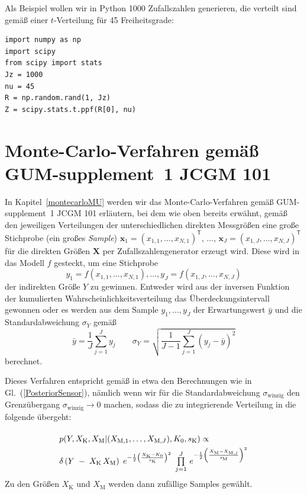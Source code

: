 Als Beispiel wollen wir in Python 1000 Zufalls\-zahlen generieren,
die verteilt sind gemäß einer $t$-Verteilung für 45 Freiheitsgrade:
\begin{lstlisting}[style=Python]
import numpy as np
import scipy
from scipy import stats
Jz = 1000
nu = 45
R = np.random.rand(1, Jz)
Z = scipy.stats.t.ppf(R[0], nu)
\end{lstlisting}

\section{Monte-Carlo-Verfahren gemäß GUM-supplement~1 JCGM 101}

In Kapitel~\ref{montecarloMU} werden wir das Monte-Carlo-Verfahren gemäß GUM-supplement~1 JCGM 101
erläutern, bei dem wie oben bereits erwähnt,
gemäß den jeweiligen Ver\-teil\-ungen der unterschiedlichen direkten Messgrößen
eine große Stichprobe (ein großes \textsl{Sample}) 
$\mathbf{x}_1 = (x_{1,1},\dots,x_{N,1})^\mathsf{T}$, $\dots$, $\mathbf{x}_J = (x_{1,J},\dots,x_{N,J})^\mathsf{T}$
für die direkten Größen $\mathbf{X}$ per Zufallszahlengenerator erzeugt
wird. Diese wird in das Modell $f$ gesteckt,
um eine Stichprobe
\begin{equation}
y_1 = f(x_{1,1},\dots,x_{N,1}), \dots, y_J = f(x_{1,J},\dots,x_{N,J})
\end{equation}
der indirekten Größe $Y$ zu gewinnen. Entweder wird aus der inversen Funktion der kumulierten
Wahrscheinlichkeitsverteilung das Überdeckungsintervall gewonnen oder es werden aus dem Sample $y_1,\dots, y_J$
der Erwartungswert $\bar y$ und die Standardabweichung $\sigma_Y$ gemäß
$$
\bar y = \frac{1}{J} \sum_{j=1}^{J} y_j \qquad
\sigma_Y = \sqrt{\frac{1}{J-1} \sum_{j=1}^{J} (y_j - \bar y)^2}
$$
berechnet.

Dieses Verfahren entspricht gemäß \cite{Wue08} in etwa den Berechnungen wie
in Gl.~(\ref{PosteriorSensor}), nämlich wenn wir für die Standardabweichung $\sigma_\mathrm{winzig}$
den Grenzübergang $\sigma_\mathrm{winzig} \rightarrow 0$ machen, sodass die zu integrierende
Verteilung in die folgende übergeht:
\begin{equation}
\arraycolsep=2.0pt\def\arraystretch{2.0}
\begin{array}{l}
p(Y, X_\mathrm{K}, X_\mathrm{M} | (X_{\mathrm{M},1}, \dots, X_{\mathrm{M},J}), K_0, s_\mathrm{K}) \propto \\
\delta\left(Y \; - \; X_\mathrm{K} \, X_\mathrm{M}\right)
\;  e^{-\frac{1}{2} \left(\frac{X_\mathrm{K} - K_0}{s_\mathrm{K}} \right)^2} \; \prod\limits_{j=1}^J  \,
e^{-\frac{1}{2} \left(\frac{ X_\mathrm{M} - X_{\mathrm{M},j} }{s_\mathrm{M}} \right)^2} 
\end{array}
\label{PosteriorFall4}
\end{equation}
Zu den Größen $X_\mathrm{K}$ und $X_\mathrm{M}$ werden dann zufällige
Samples gewählt.

